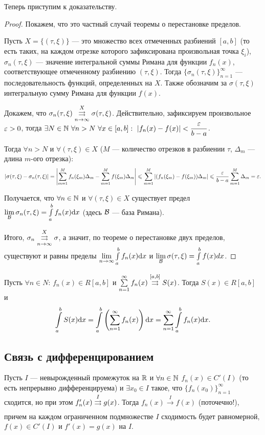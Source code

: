 \documentclass[a4paper, 12pt]{article}
\begin{document}
Теперь приступим к доказательству.
\begin{proof}
Покажем, что это частный случай теоремы о перестановке пределов.

Пусть $X = \{(\tau, \xi) \}$ --- это множество всех отмеченных разбиений $[a, b]$ (то есть таких, на каждом отрезке которого зафиксирована произвольная точка $\xi_i$), $\sigma_n(\tau, \xi)$ --- значение интегральной суммы Римана для функции $f_n(x)$, соответствующее отмеченному разбиению $(\tau, \xi)$. Тогда $\{\sigma_n(\tau, \xi) \}_{n=1}^\infty$ --- последовательность функций, определенных на $X$. Также обозначим за $\sigma(\tau, \xi)$ интегральную сумму Римана для функции $f(x)$.

Докажем, что $\sigma_n(\tau, \xi) \overset{X}{\underset{n \to \infty}{\rightrightarrows}} \sigma(\tau, \xi)$. Действительно, зафиксируем произвольное $\varepsilon > 0$, тогда $\exists N \in \N\ \forall n > N\ \forall x \in[a, b]:\ |f_n(x) - f(x)| < \dfrac{\eps}{b-a}$.

Тогда $\forall n > N$ и $\forall (\tau, \xi) \in X$ ($M$ --- количество отрезков в разбиении $\tau$, $\Delta_m$ --- длина $m$-ого отрезка):
\begin{gather}
|\sigma(\tau, \xi) - \sigma_n(\tau, \xi)| = \left| \sum\limits_{m=1}^{M}f_n(\xi_m)\Delta_m - \sum\limits_{m=1}^{M}f(\xi_m)\Delta_m \right| \leqslant \sum\limits_{m=1}^M \left| (f_n(\xi_m) - f(\xi_m))\Delta_m \right| \leqslant \frac{\varepsilon}{b-a}\sum\limits_{m=1}^M \Delta_m = \varepsilon.
\end{gather}

Получается, что $\forall n \in \mathbb{N}$ и $\forall (\tau, \xi) \in X$ существует предел $\lim\limits_{\mathcal{B}} \sigma_n(\tau, \xi) = \int\limits_a^bf_n(x)\mathrm{d}x$ (здесь $\mathcal{B}$ --- база Римана).

Итого, $\sigma_n \overset{X}{\underset{n \to \infty}{\rightrightarrows}} \sigma$, а значит, по теореме о перестановке двух пределов, существуют и равны пределы $\lim\limits_{n \to \infty} \int\limits_a^b f_n(x) \mathrm{d}x$ и $\lim\limits_{\mathcal{B}}\sigma(\tau, \xi) = \int\limits_a^bf(x)dx$.
\end{proof}

\begin{Consequence}
Пусть $\forall n \in N$: $f_n(x) \in R[a, b]$ и $\sum\limits_{n=1}^{\infty} f_n(x) \overset{[a, b]}{\underset{}{\rightrightarrows}} S(x)$. Тогда $S(x) \in R[a, b]$ и 
$$
\int\limits_a^bS(x) \mathrm{d}x = \int\limits_a^b \left(\sum\limits_{n=1}^{\infty} f_n(x)\right) \mathrm{d}x = \sum\limits_{n=1}^{\infty} \int\limits_a^b f_n(x)\mathrm{d}x.
$$
\end{Consequence}

\subsection{Связь с дифференцированием}
\begin{Statement}
Пусть $I$ --- невырожденный промежуток на $\mathbb{R}$ и $\forall n \in \mathbb{N}$ $f_n(x) \in C'(I)$ (то есть непрерывно дифференцируема) и $\exists x_0 \in I$ такое, что $\{f_n(x_0) \}_{n=1}^\infty$ сходится, но при этом $f'_n(x) \overset{I}{\underset{}{\rightrightarrows}}g(x)$.
Тогда $f_n(x) \overset{I}{\to} f(x)$ (поточечно!), причем на каждом ограниченном подмножестве $I$ сходимость будет равномерной, $f(x) \in C'(I)$ и $f'(x) = g(x)$ на $I$.
\end{Statement}
\end{document}
